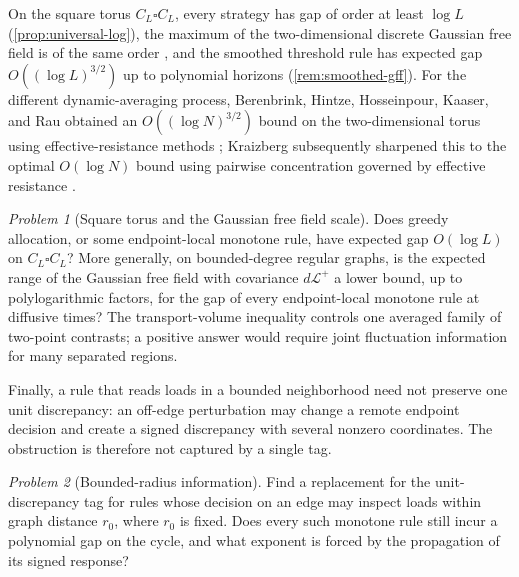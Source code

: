 \documentclass[11pt]{article}
\theoremstyle{remark}
\newtheorem{problem}[problem]{Problem}
\begin{document}
On the square torus $C_L\square C_L$, every strategy has gap of order at least $\log L$ (\cref{prop:universal-log}), the maximum of the two-dimensional discrete Gaussian free field is of the same order \cite{BramsonDingZeitouni2016}, and the smoothed threshold rule has expected gap $O((\log L)^{3/2})$ up to polynomial horizons (\cref{rem:smoothed-gff}). For the different dynamic-averaging process, Berenbrink, Hintze, Hosseinpour, Kaaser, and Rau obtained an $O((\log N)^{3/2})$ bound on the two-dimensional torus using effective-resistance methods \cite{BerenbrinkEtAl2023}; Kraizberg subsequently sharpened this to the optimal $O(\log N)$ bound using pairwise concentration governed by effective resistance \cite{Kraizberg2026}.

\begin{problem}[Square torus and the Gaussian free field scale]
Does greedy allocation, or some endpoint-local monotone rule, have expected gap $O(\log L)$ on $C_L\square C_L$? More generally, on bounded-degree regular graphs, is the expected range of the Gaussian free field with covariance $d\mathcal L^+$ a lower bound, up to polylogarithmic factors, for the gap of every endpoint-local monotone rule at diffusive times? The transport-volume inequality controls one averaged family of two-point contrasts; a positive answer would require joint fluctuation information for many separated regions.
\end{problem}

Finally, a rule that reads loads in a bounded neighborhood need not preserve one unit discrepancy: an off-edge perturbation may change a remote endpoint decision and create a signed discrepancy with several nonzero coordinates. The obstruction is therefore not captured by a single tag.

\begin{problem}[Bounded-radius information]
Find a replacement for the unit-discrepancy tag for rules whose decision on an edge may inspect loads within graph distance $r_0$, where $r_0$ is fixed. Does every such monotone rule still incur a polynomial gap on the cycle, and what exponent is forced by the propagation of its signed response?
\end{problem}
\end{document}
